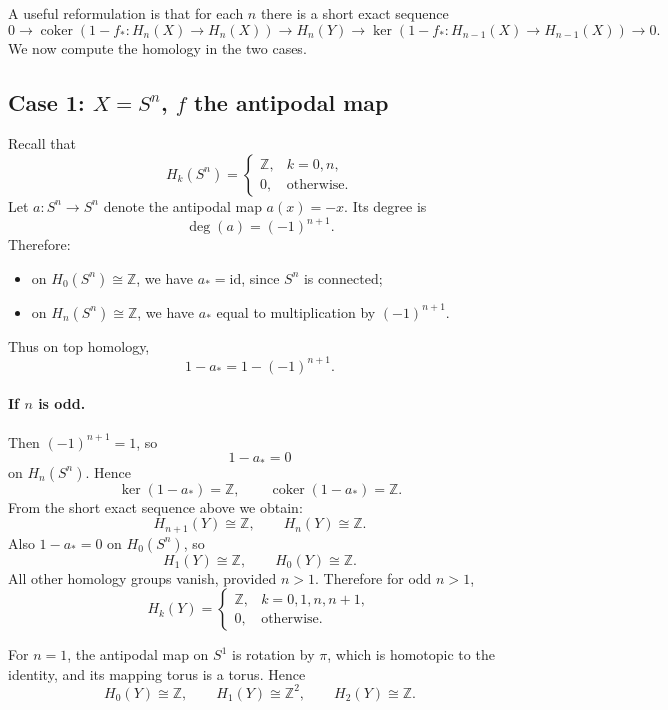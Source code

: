 \documentclass[12pt,a4paper]{article}
\theoremstyle{notespace}
\begin{document}
A useful reformulation is that for each \(n\) there is a short exact sequence
\[
0\longrightarrow \operatorname{coker}(1-f_*:H_n(X)\to H_n(X))
\longrightarrow H_n(Y)
\longrightarrow \ker(1-f_*:H_{n-1}(X)\to H_{n-1}(X))
\longrightarrow 0.
\]
We now compute the homology in the two cases.

\subsection*{Case 1: \(X=S^n\), \(f\) the antipodal map}

Recall that
\[
H_k(S^n)=
\begin{cases}
	\mathbb Z, & k=0,n,\\
	0, & \text{otherwise}.
\end{cases}
\]
Let \(a:S^n\to S^n\) denote the antipodal map \(a(x)=-x\). Its degree is
\[
\deg(a)=(-1)^{n+1}.
\]
Therefore:
\begin{itemize}
	\item on \(H_0(S^n)\cong \mathbb Z\), we have \(a_*=\mathrm{id}\), since \(S^n\) is connected;
	\item on \(H_n(S^n)\cong \mathbb Z\), we have \(a_*\) equal to multiplication by \((-1)^{n+1}\).
\end{itemize}

Thus on top homology,
\[
1-a_*=1-(-1)^{n+1}.
\]

\paragraph{If \(n\) is odd.}
Then \((-1)^{n+1}=1\), so
\[
1-a_*=0
\]
on \(H_n(S^n)\). Hence
\[
\ker(1-a_*)=\mathbb Z,\qquad \operatorname{coker}(1-a_*)=\mathbb Z.
\]
From the short exact sequence above we obtain:
\[
H_{n+1}(Y)\cong \mathbb Z,
\qquad
H_n(Y)\cong \mathbb Z.
\]
Also \(1-a_*=0\) on \(H_0(S^n)\), so
\[
H_1(Y)\cong \mathbb Z,
\qquad
H_0(Y)\cong \mathbb Z.
\]
All other homology groups vanish, provided \(n>1\). Therefore for odd \(n>1\),
\[
H_k(Y)=
\begin{cases}
	\mathbb Z, & k=0,1,n,n+1,\\
	0, & \text{otherwise}.
\end{cases}
\]

For \(n=1\), the antipodal map on \(S^1\) is rotation by \(\pi\), which is homotopic to the identity, and its mapping torus is a torus. Hence
\[
H_0(Y)\cong \mathbb Z,\qquad
H_1(Y)\cong \mathbb Z^2,\qquad
H_2(Y)\cong \mathbb Z.
\]
\end{document}
